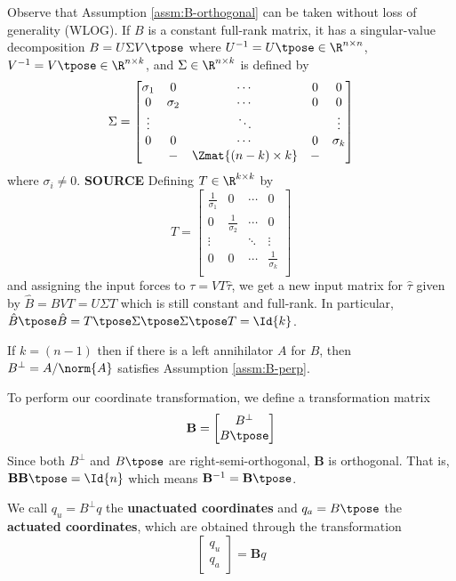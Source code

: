 Observe that Assumption \ref{assm:B-orthogonal} can be taken without loss of
generality (WLOG). If \(B\) is a constant full-rank matrix, 
it has a singular-value decomposition 
\(B = U \Sigma V\tpose\) where \(U^{-1} = U\tpose \in \R^{n \times n}\), 
\(V^{-1} = V\tpose \in \R^{n \times k}\), and \(\Sigma \in \R^{n \times k}\) is
defined by
\[
    \Sigma = \begin{bmatrix}
        \sigma_1 & 0 & \cdots & 0 & 0 \\
        0 & \sigma_2 & \cdots & 0 & 0 \\
        \vdots & & \ddots &  & \vdots \\
        0 & 0 & \cdots & 0 & \sigma_k \\
          & - & \Zmat{(n-k)\times k} & -  &\\
    \end{bmatrix}
\]
where \(\sigma_i \neq 0\).
\textbf{SOURCE}
Defining \(T \in \R^{k \times k}\) by
\[
    T = \begin{bmatrix}
        \frac{1}{\sigma_1} & 0 & \cdots & 0 \\
        0 & \frac{1}{\sigma_2} & \cdots & 0 \\
    \vdots & & \ddots & \vdots \\
    0 & 0 & \cdots & \frac{1}{\sigma_k} \\
    \end{bmatrix}
\]
and assigning the input forces to \(\tau = V T \hat{\tau}\), we get a new input
matrix for \(\hat{\tau}\) given by \(\hat{B} = B V T = U \Sigma T\) 
which is still constant and full-rank. In particular, 
\(\hat{B}\tpose \hat{B} = T\tpose \Sigma\tpose \Sigma\tpose T = \Id{k}\).

If \(k = (n-1)\) then if there is a left annihilator \(A\) for
\(B\), then \(B^\perp = A/\norm{A}\) satisfies Assumption
\ref{assm:B-perp}.

To perform our coordinate transformation, we define a transformation matrix
\[
    \mathbf{B} = 
    \begin{bmatrix}
        B^\perp \\
        B\tpose \\
    \end{bmatrix}
\]
Since both \(B^\perp\) and \(B\tpose\) are right-semi-orthogonal, 
\(\mathbf{B}\) is orthogonal. That is,
\(\mathbf{B}\mathbf{B}\tpose = \Id{n}\) which means
\(\mathbf{B}^{-1} = \mathbf{B}\tpose\).

\begin{defn}
    We call \(q_u = B^\perp q\) the \textbf{unactuated coordinates} and 
    \(q_a = B\tpose\) the \textbf{actuated coordinates}, which are obtained
    through the transformation
    \[
        \begin{bmatrix} q_u \\ q_a \end{bmatrix} = \mathbf{B}q
    \]
\end{defn}

